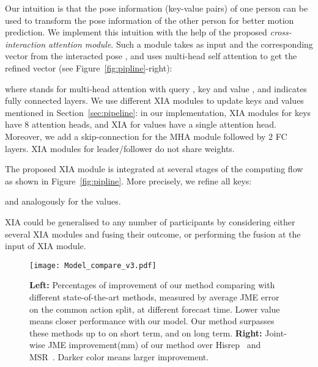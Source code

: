 Our intuition is that the pose information (key-value pairs) of one person can be used to transform the pose information of the other person for better motion prediction. We implement this intuition with the help of the proposed \textit{cross-interaction attention module}. Such a module takes as input  and the corresponding vector from the interacted pose , and uses multi-head self attention to get the refined vector  (see Figure~\ref{fig:pipline}-right):
 
where  stands for multi-head attention with query , key  and value , and  indicates fully connected layers.
We use different XIA modules to update keys and values mentioned in Section~\ref{sec:pipeline}: in our implementation, XIA modules for keys have 8 attention heads, and XIA for values have a single attention head. Moreover, we add a skip-connection for the MHA module followed by 2 FC layers. XIA modules for leader/follower do not share weights.

The proposed XIA module is integrated at several stages of the computing flow as shown in Figure~\ref{fig:pipline}. More precisely, we refine all keys:

and analogously for the values. 

XIA could be  generalised to any number of participants by considering either several XIA modules and fusing their outcome, or performing the fusion at the input of XIA module.

\begin{figure*}[t]
\centering
\texttt{[image: Model\_compare\_v3.pdf]}
\vspace{-0.3cm}
  \caption{\textbf{Left:} Percentages of improvement of  our method comparing with different state-of-the-art methods, measured by average JME error on the common action split, at different forecast time. Lower value means closer performance with our model. Our method surpasses these methods up to  on short term,  and  on long term. \textbf{Right:} Joint-wise JME improvement(mm) of our method over Hisrep~\cite{mao2020history} and MSR~\cite{Li_2021_ICCV}. Darker color means larger improvement.}\vspace{-5mm}
\label{fig:res_ca}
\end{figure*}


\vspace{7mm}
